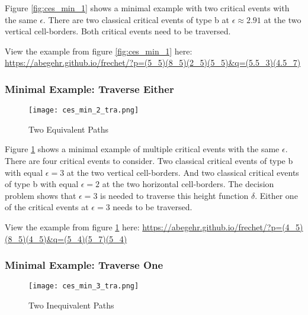 Figure \ref{fig:ces_min_1} shows a minimal example with two critical events with the same $\epsilon$. There are two classical critical events of type b at $\epsilon \approx 2.91$ at the two vertical cell-borders. Both critical events need to be traversed.

View the example from figure \ref{fig:ces_min_1} here: \url{https://abegehr.github.io/frechet/?p=(5_5)(8_5)(2_5)(5_5)&q=(5.5_3)(4.5_7)}


\subsubsection{Minimal Example: Traverse Either}\label{sec:ces_min_2}

\begin{figure}[H]
    \centering
    
    \texttt{[image: ces\_min\_2\_tra.png]}
		
	\caption{Two Equivalent Paths}
    \label{fig:ces_min_2}
\end{figure}

Figure \ref{fig:ces_min_2} shows a minimal example of multiple critical events with the same $\epsilon$. There are four critical events to consider. Two classical critical events of type b with equal $\epsilon = 3$ at the two vertical cell-borders. And two classical critical events of type b with equal $\epsilon = 2$ at the two horizontal cell-borders. The decision problem shows that $\epsilon = 3$ is needed to traverse this height function $\delta$. Either one of the critical events at $\epsilon = 3$ needs to be traversed.

View the example from figure \ref{fig:ces_min_2} here: \url{https://abegehr.github.io/frechet/?p=(4_5)(8_5)(4_5)&q=(5_4)(5_7)(5_4)}



\subsubsection{Minimal Example: Traverse One}

\begin{figure}[H]
    \centering
    
    \texttt{[image: ces\_min\_3\_tra.png]}
		
	\caption{Two Inequivalent Paths}
    \label{fig:ces_min_3}
\end{figure}

